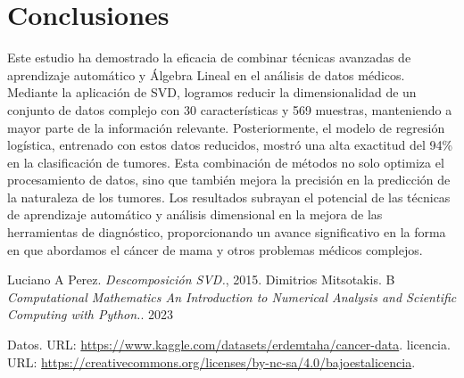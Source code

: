 \documentclass[a4paper,10pt,twocolumn]{article}
\begin{document}
\section{Conclusiones}
Este estudio ha demostrado la eficacia de combinar técnicas avanzadas de aprendizaje automático y Álgebra Lineal en el análisis de datos médicos. Mediante la aplicación de SVD, logramos reducir la dimensionalidad de un conjunto de datos complejo con 30 características y 569 muestras, manteniendo a mayor parte de la información relevante. Posteriormente, el modelo de regresión logística, entrenado con estos datos reducidos, mostró una alta exactitud del 94\% en la clasificación de tumores. Esta combinación de métodos no solo optimiza el procesamiento de datos, sino que también mejora la precisión en la predicción de la naturaleza de los tumores. Los resultados subrayan el potencial de las técnicas de aprendizaje automático y análisis dimensional en la mejora de las herramientas de diagnóstico, proporcionando un avance significativo en la forma en que abordamos el cáncer de mama y otros problemas médicos complejos.
	
		
	





\begin{thebibliography}{99}
	 Luciano A Perez. \emph{Descomposición SVD.}, 2015.
	 Dimitrios Mitsotakis. B \emph{Computational Mathematics An Introduction to Numerical Analysis and Scientific Computing with Python.}. 2023

	 Datos. URL: \href{https://www.kaggle.com/datasets/erdemtaha/cancer-data}
{https://www.kaggle.com/datasets/erdemtaha/cancer-data}.
 licencia. URL: \href{https://creativecommons.org/licenses/by-nc-sa/4.0/bajoestalicencia}
{https://creativecommons.org/licenses/by-nc-sa/4.0/bajoestalicencia}.
\end{thebibliography}


\label{end}
\end{document}
